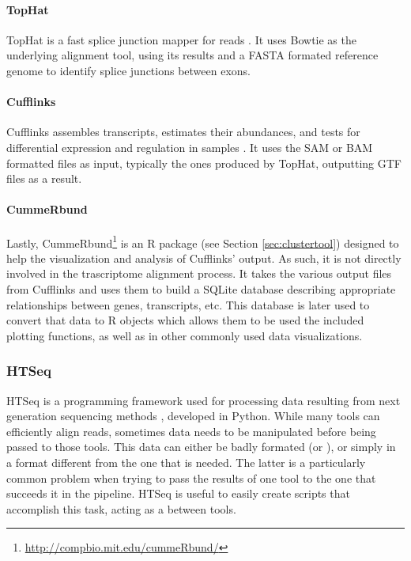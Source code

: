 \paragraph{TopHat}

TopHat is a fast splice junction mapper for \rnaseq{} reads
\cite{Trapnell01052009}. It uses Bowtie as the underlying alignment tool, using
its results and a FASTA formated reference genome to identify splice junctions
between exons.

\paragraph{Cufflinks}

Cufflinks assembles transcripts, estimates their abundances, and tests for
differential expression and regulation in \rnaseq{} samples
\cite{trapnell2010transcript}. It uses the SAM or BAM formatted files as input,
typically the ones produced by TopHat, outputting GTF files as a result.

\paragraph{CummeRbund}

Lastly, CummeRbund\footnote{\url{http://compbio.mit.edu/cummeRbund/}} is an R
package (see Section \ref{sec:clustertool}) designed to help the visualization and
analysis of Cufflinks' \rnaseq{} output. As such, it is not directly involved in
the trascriptome alignment process. It takes the various output files from
Cufflinks and uses them to build a SQLite database describing appropriate
relationships between genes, transcripts, etc. This database is later used to
convert that data to R objects which allows them to be used the included
plotting functions, as well as in other commonly used data visualizations.

\subsubsection*{HTSeq}

HTSeq is a programming framework used for processing data resulting from next
generation sequencing methods \cite{htseq}, developed in Python. While many
tools can efficiently align reads, sometimes data needs to be manipulated before
being passed to those tools. This data can either be badly formated (or
), or simply in a format different from the one that is needed. The
latter is a particularly common problem when trying to pass the results of one
tool to the one that succeeds it in the pipeline. HTSeq is useful to easily
create scripts that accomplish this task, acting as a  between tools.


